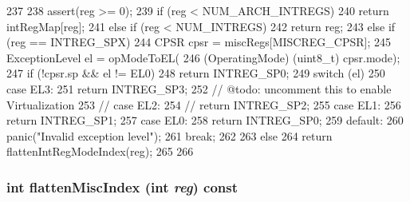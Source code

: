 \begin{DoxyCode}
237         {
238             assert(reg >= 0);
239             if (reg < NUM_ARCH_INTREGS) {
240                 return intRegMap[reg];
241             } else if (reg < NUM_INTREGS) {
242                 return reg;
243             } else if (reg == INTREG_SPX) {
244                 CPSR cpsr = miscRegs[MISCREG_CPSR];
245                 ExceptionLevel el = opModeToEL(
246                     (OperatingMode) (uint8_t) cpsr.mode);
247                 if (!cpsr.sp && el != EL0)
248                     return INTREG_SP0;
249                 switch (el) {
250                   case EL3:
251                     return INTREG_SP3;
252                   // @todo: uncomment this to enable Virtualization
253                   // case EL2:
254                   //   return INTREG_SP2;
255                   case EL1:
256                     return INTREG_SP1;
257                   case EL0:
258                     return INTREG_SP0;
259                   default:
260                     panic("Invalid exception level");
261                     break;
262                 }
263             } else {
264                 return flattenIntRegModeIndex(reg);
265             }
266         }
\end{DoxyCode}
\hypertarget{structArmISA_1_1ISA_a8997760aa4425793911f57440a4dd8ae}{
\subsubsection[{flattenMiscIndex}]{\setlength{\rightskip}{0pt plus 5cm}int flattenMiscIndex (int {\em reg}) const}}
\label{structArmISA_1_1ISA_a8997760aa4425793911f57440a4dd8ae}



